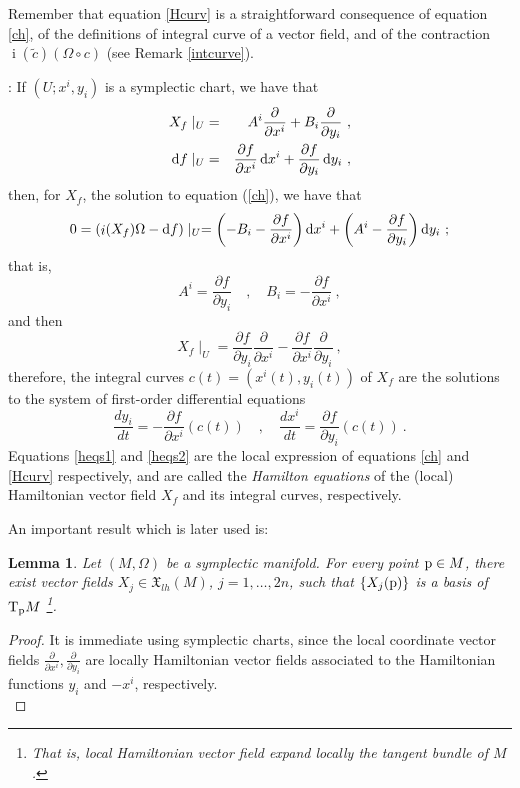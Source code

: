 \documentclass[12pt]{report}
\newtheorem{lem}[teor]{Lemma}
\def\beq{\begin{equation}}
\def\eeq{\end{equation}}
\def\derpar#1#2{\frac{\partial{#1}}{\partial{#2}}}
\def\qed{\ifvmode\removelastskip\fi
{\unskip\nobreak\hfil\penalty50\hbox{}\nobreak\hfil
\hbox{\vrule height1.2ex width1.2ex}\parfillskip=0pt
\finalhyphendemerits=0 \par\smallskip}}
\def\vf{\mathfrak X}
\def\d{{\rm d}}
\def\Tan{{\rm T}}
\def\inn{\mathop{i}\nolimits}
\begin{document}
Remember that equation \eqref{Hcurv} is a straightforward consequence of equation \eqref{ch}, 
of the definitions of integral curve of a vector field, and of the contraction 
$\inn(\widetilde c)(\Omega\circ c)$
(see Remark \ref{intcurve}).

:
If $(U;x^i,y_i)$ is a symplectic chart, we have that
\begin{eqnarray*}
X_{f}\mid_U &=& A^i\derpar{}{x^i}+B_i\derpar{}{y_i} \ ,
\\
\d f\mid_U &=& \derpar{f}{x^i}\,\d x^i + \derpar{f}{y_i}\,\d y_i \ ,
\end{eqnarray*}
then, for $X_{f}$, the solution to equation (\ref{ch}), we have that
$$
0 = (\inn(X_{f})\Omega - \d f)\mid_U
=\left( -B_i - \derpar{f}{x^i}\right)\d x^i +
\left( A^i - \derpar{f}{y_i}\right)\d y_i \ ;
$$
that is,
\beq
A^i = \derpar{f}{y_i} \quad , \quad B_i= -\derpar{f}{x^i} \ ,
\label{heqs1}
\eeq
and then
\beq
\label{eq:locHvf}
X_{f}\mid_U = \derpar{f}{y_i}\derpar{}{x^i}-\derpar{f}{x^i}\derpar{}{y_i} \ ,
\eeq
 therefore, the integral curves $c(t)=(x^i(t),y_i(t))$ of $X_{f}$ are the solutions to the system of 
first-order differential equations
\beq
\frac{d y_i}{d t} = -\derpar{f}{x^i}(c(t))
\quad , \quad
\frac{d x^i}{d t} = \derpar{f}{y_i}(c(t)) \ .
\label{heqs2}
\eeq
Equations \eqref{heqs1} and  \eqref{heqs2} are the local expression of equations 
 \eqref{ch} and \eqref{Hcurv} respectively, and are called the {\sl Hamilton equations} 
of the (local) Hamiltonian vector field $X_{f}$ and its integral curves, respectively.

An important result which is later used is:

\begin{lem}
Let $(M,\Omega)$ be a symplectic manifold.
For every point ${\rm p}\in M$, there exist vector fields $X_j\in\vf_{lh}(M)$, $j=1,\ldots ,2n$,
such that $\{ X_j({\rm p})\}$ is a basis of $\Tan_{\rm p}M$ 
\footnote{
That is, local Hamiltonian vector field expand locally the
tangent bundle of $M$.
}.
\label{auxil}
\end{lem}
\begin{proof}
It is immediate using symplectic charts,
since the local coordinate vector fields 
$\displaystyle\derpar{}{x^i},\derpar{}{y_i}$
are locally Hamiltonian vector fields associated to the Hamiltonian functions
$y_i$ and $-x^i$, respectively.
\\ \qed  \end{proof}
\end{document}
